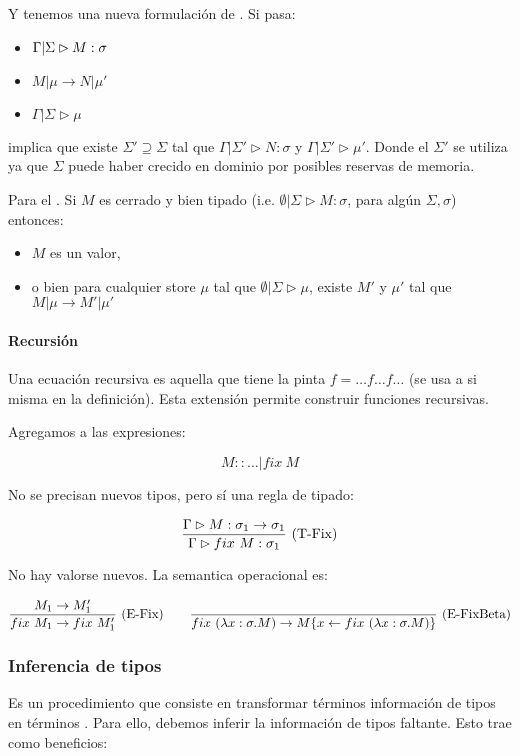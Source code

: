 Y tenemos una nueva formulación de . Si pasa:
\begin{itemize}
  \item $\Gamma|\Sigma \rhd M : \sigma$
  \item $M \vert \mu \to N \vert \mu'$
  \item $\Gamma|\Sigma \rhd \mu$
\end{itemize}
implica que existe $\Sigma' \supseteq \Sigma$ tal que $\Gamma|\Sigma' \rhd N : \sigma$ y $\Gamma|\Sigma' \rhd \mu'$. Donde el $\Sigma'$ se utiliza ya que $\Sigma$ puede haber crecido en dominio por posibles reservas de memoria.

Para el . Si $M$ es cerrado y bien tipado (i.e. $\emptyset|\Sigma \rhd M : \sigma$, para algún $\Sigma, \sigma$) entonces:
\begin{itemize}
  \item $M$ es un valor,
  \item  o bien para cualquier store $\mu$ tal que $\emptyset|\Sigma \rhd \mu$, existe $M'$ y $\mu'$ tal que $M \vert \mu \to M' \vert \mu'$
\end{itemize}

\paragraph{Recursión}

Una ecuación recursiva es aquella que tiene la pinta $f = \dots f \dots f \dots$ (se usa a si misma en la definición). Esta extensión permite construir funciones recursivas.

Agregamos a las expresiones:

\[M :: \dots \vert fix\ M\]

No se precisan nuevos tipos, pero sí una regla de tipado:

\[\frac{\Gamma \rhd M : \sigma_1 \to \sigma_1}{\Gamma \rhd fix\ M : \sigma_1}\ \text{(T-Fix)}\]

No hay valorse nuevos. La semantica operacional es:

\[\deriv{M_1 \to M_1'}{fix\ M_1 \to fix\ M_1'}{E-Fix}\quad\quad \deriv{}{fix\ (\abs{x}{\sigma}{M}) \to \sust{M}{x\from fix\  (\abs{x}{\sigma}{M})}}{E-FixBeta}\]

\subsubsection{Inferencia de tipos}

Es un procedimiento que consiste en transformar términos  información de tipos en términos . Para ello, debemos inferir la información de tipos faltante. Esto trae como beneficios:

